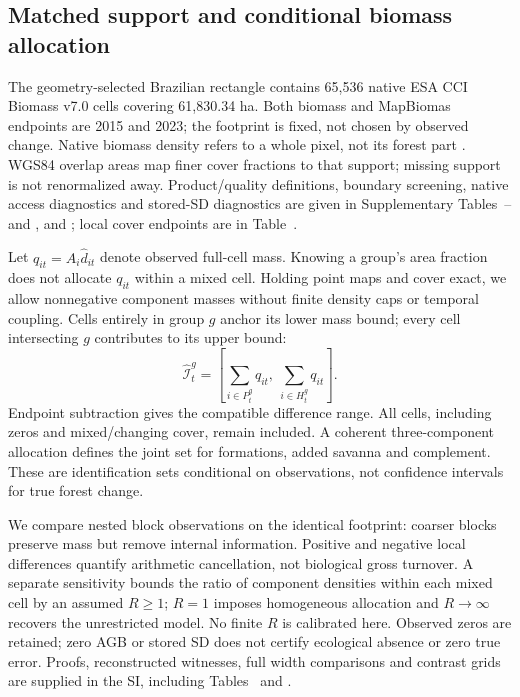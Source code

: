 \documentclass[11pt,a4paper]{article}
\begin{document}
\subsection{Matched support and conditional biomass allocation}
The geometry-selected Brazilian rectangle contains 65,536 native ESA CCI Biomass v7.0 cells covering 61,830.34 ha. Both biomass and MapBiomas endpoints are 2015 and 2023; the footprint is fixed, not chosen by observed change. Native biomass density refers to a whole pixel, not its forest part \citep{SantoroCartus2026,PUG2026}. WGS84 overlap areas map finer cover fractions to that support; missing support is not renormalized away. Product/quality definitions, boundary screening, native access diagnostics and stored-SD diagnostics are given in Supplementary Tables~-- and ,  and ; local cover endpoints are in Table~.

Let $q_{it}=A_i\widehat d_{it}$ denote observed full-cell mass. Knowing a group's area fraction does not allocate $q_{it}$ within a mixed cell. Holding point maps and cover exact, we allow nonnegative component masses without finite density caps or temporal coupling. Cells entirely in group $g$ anchor its lower mass bound; every cell intersecting $g$ contributes to its upper bound:
\begin{equation}
\widehat{\mathcal I}_t^g=\left[\sum_{i\in P_t^g}q_{it},\ \sum_{i\in H_t^g}q_{it}\right].\label{eq:allocationmain}
\end{equation}
Endpoint subtraction gives the compatible difference range. All cells, including zeros and mixed/changing cover, remain included. A coherent three-component allocation defines the joint set for formations, added savanna and complement. These are identification sets conditional on observations, not confidence intervals for true forest change.

We compare nested block observations on the identical footprint: coarser blocks preserve mass but remove internal information. Positive and negative local differences quantify arithmetic cancellation, not biological gross turnover. A separate sensitivity bounds the ratio of component densities within each mixed cell by an assumed $R\ge1$; $R=1$ imposes homogeneous allocation and $R\to\infty$ recovers the unrestricted model. No finite $R$ is calibrated here. Observed zeros are retained; zero AGB or stored SD does not certify ecological absence or zero true error. Proofs, reconstructed witnesses, full width comparisons and contrast grids are supplied in the SI, including Tables~ and .
\end{document}
